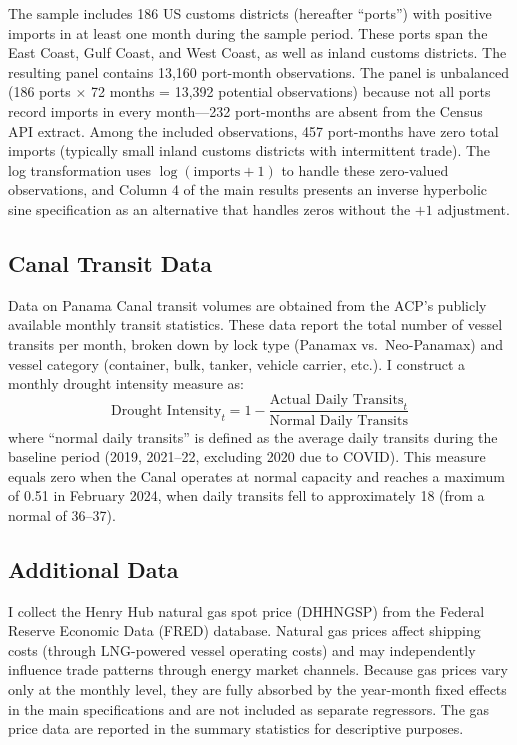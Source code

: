 \documentclass[12pt]{article}
\begin{document}
The sample includes 186 US customs districts (hereafter ``ports'') with positive imports in at least one month during the sample period. These ports span the East Coast, Gulf Coast, and West Coast, as well as inland customs districts. The resulting panel contains 13,160 port-month observations. The panel is unbalanced (186 ports $\times$ 72 months = 13,392 potential observations) because not all ports record imports in every month---232 port-months are absent from the Census API extract. Among the included observations, 457 port-months have zero total imports (typically small inland customs districts with intermittent trade). The log transformation uses $\log(\text{imports} + 1)$ to handle these zero-valued observations, and Column 4 of the main results presents an inverse hyperbolic sine specification as an alternative that handles zeros without the $+1$ adjustment.

\subsection{Canal Transit Data}

Data on Panama Canal transit volumes are obtained from the ACP's publicly available monthly transit statistics. These data report the total number of vessel transits per month, broken down by lock type (Panamax vs.\ Neo-Panamax) and vessel category (container, bulk, tanker, vehicle carrier, etc.). I construct a monthly drought intensity measure as:
\begin{equation}
    \text{Drought Intensity}_t = 1 - \frac{\text{Actual Daily Transits}_t}{\text{Normal Daily Transits}}
\label{eq:drought}
\end{equation}
where ``normal daily transits'' is defined as the average daily transits during the baseline period (2019, 2021--22, excluding 2020 due to COVID). This measure equals zero when the Canal operates at normal capacity and reaches a maximum of 0.51 in February 2024, when daily transits fell to approximately 18 (from a normal of 36--37).

\subsection{Additional Data}

I collect the Henry Hub natural gas spot price (DHHNGSP) from the Federal Reserve Economic Data (FRED) database. Natural gas prices affect shipping costs (through LNG-powered vessel operating costs) and may independently influence trade patterns through energy market channels. Because gas prices vary only at the monthly level, they are fully absorbed by the year-month fixed effects in the main specifications and are not included as separate regressors. The gas price data are reported in the summary statistics for descriptive purposes.
\end{document}

